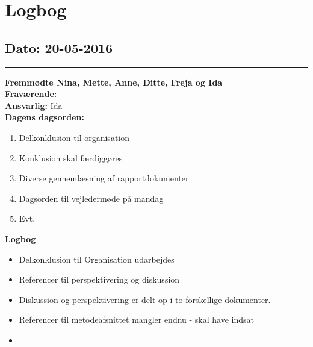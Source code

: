 \chapter{Logbog}
\section{Dato: 20-05-2016}
\hrule
\textbf{Fremmødte Nina, Mette, Anne, Ditte, Freja og Ida } \\
\textbf{Fraværende: } \\
\textbf{Ansvarlig:} Ida  \\
\textbf{Dagens dagsorden: }
\begin{enumerate}
\item Delkonklusion til organisation
\item Konklusion skal færdiggøres
\item Diverse gennemlæsning af rapportdokumenter
\item Dagsorden til vejledermøde på mandag
\item Evt.
\end{enumerate}

\underline{\textbf{Logbog}}
\begin{itemize}
\item Delkonklusion til Organisation udarbejdes
\item Referencer til perspektivering og diskussion
\item Diskussion og perspektivering er delt op i to forskellige dokumenter.
\item Referencer til metodeafsnittet mangler endnu - skal have indsat
\item 
\end{itemize}
\newpage
